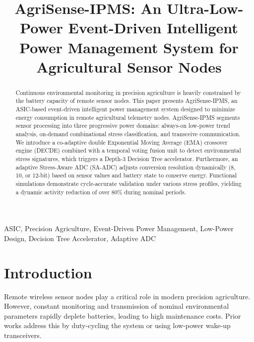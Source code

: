 \documentclass[conference]{IEEEtran}
\begin{document}
\title{AgriSense-IPMS: An Ultra-Low-Power Event-Driven Intelligent Power Management System for Agricultural Sensor Nodes\\
}

\author{
}

\maketitle

\begin{abstract}
Continuous environmental monitoring in precision agriculture is heavily constrained by the battery capacity of remote sensor nodes. This paper presents AgriSense-IPMS, an ASIC-based event-driven intelligent power management system designed to minimize energy consumption in remote agricultural telemetry nodes. AgriSense-IPMS segments sensor processing into three progressive power domains: always-on low-power trend analysis, on-demand combinational stress classification, and transceive communication. We introduce a co-adaptive double Exponential Moving Average (EMA) crossover engine (DECDE) combined with a temporal voting fusion unit to detect environmental stress signatures, which triggers a Depth-3 Decision Tree accelerator. Furthermore, an adaptive Stress-Aware ADC (SA-ADC) adjusts conversion resolution dynamically (8, 10, or 12-bit) based on sensor values and battery state to conserve energy. Functional simulations demonstrate cycle-accurate validation under various stress profiles, yielding a dynamic activity reduction of over 80\% during nominal periods.
\end{abstract}

\begin{IEEEkeywords}
ASIC, Precision Agriculture, Event-Driven Power Management, Low-Power Design, Decision Tree Accelerator, Adaptive ADC
\end{IEEEkeywords}

\section{Introduction}
Remote wireless sensor nodes play a critical role in modern precision agriculture. However, constant monitoring and transmission of nominal environmental parameters rapidly deplete batteries, leading to high maintenance costs. Prior works address this by duty-cycling the system or using low-power wake-up transceivers. 
\end{document}
